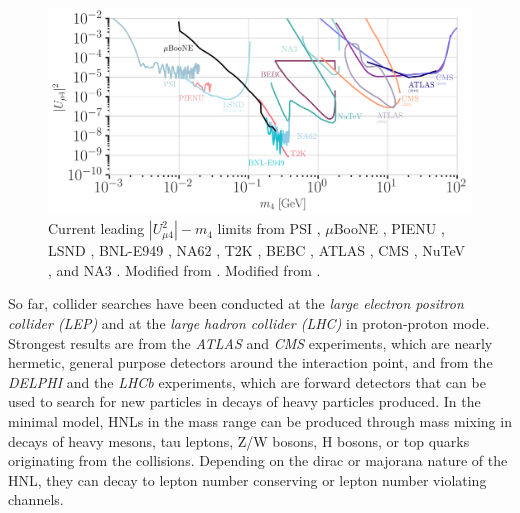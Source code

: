 \begin{figure}[t]
    \includegraphics{figures/hnl_simulation/theory/UmuN_majorana.png}
      \caption[Current leading $|U_{\mu4}^2|-m_4$ limits]{Current leading $|U_{\mu4}^2|-m_4$ limits from PSI , $\mu$BooNE \cite{MicroBooNE:2023eef}, PIENU \cite{pienu_Bryman:2019bjg}, LSND , BNL-E949 \cite{BNL_E949:2014gsn}, NA62 \cite{NA62:2022pyf}, T2K \cite{T2K:2019jwa}, BEBC \cite{BEBC_OG_COOPERSARKAR1985207},
      ATLAS \cite{ATLAS:2019kpx, atlas_2022_HNL_PhysRevLett.131.061803}, CMS \cite{CMS:2018iaf, CMS:2022fut}, NuTeV \cite{NuTeV:1999kej}, and NA3 . Modified from \cite{hoster_limitFernandez-Martinez:2023phj}. Modified from \cite{hoster_limitFernandez-Martinez:2023phj}.}
\end{figure}



So far, collider searches have been conducted at the \textit{large electron positron collider (LEP)} and at the \textit{large hadron collider (LHC)} in proton-proton mode.
Strongest results are from the \textit{ATLAS} and \textit{CMS} experiments, which are nearly hermetic, general purpose detectors around the interaction point, and from the \textit{DELPHI} and the \textit{LHCb} experiments, which are forward detectors that can be used to search for new particles in decays of heavy particles produced. In the minimal model, HNLs in the \si{\gev} mass range can be produced through mass mixing in decays of heavy mesons, tau leptons, Z/W bosons, H bosons, or top quarks originating from the collisions. Depending on the dirac or majorana nature of the HNL, they can decay to lepton number conserving or lepton number violating channels.

